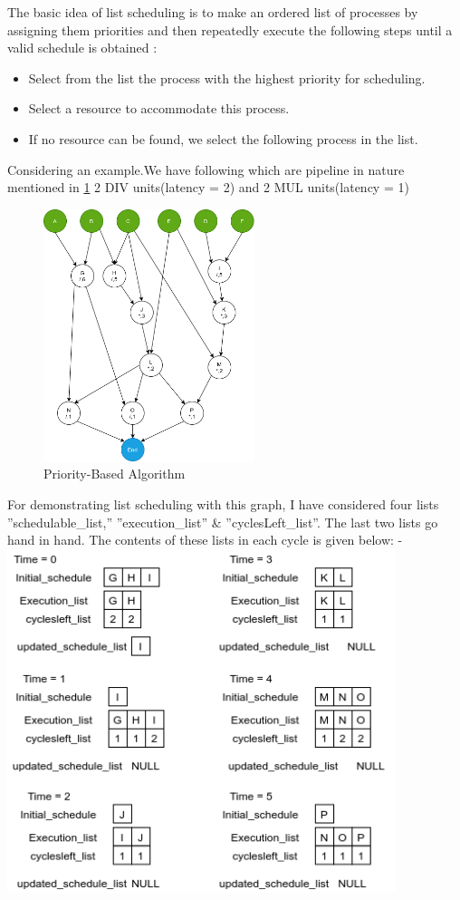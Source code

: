 The basic idea of list scheduling is to make an ordered list of processes by assigning them  priorities and then repeatedly execute the following steps until a valid schedule is obtained :
\begin{itemize}
        \item Select from the list the process with the highest priority for scheduling.
        \item Select a resource to accommodate this process.
        \item If no resource can be found, we select the following process in the list.
\end{itemize}
Considering an example.We have following which are pipeline in nature mentioned in \ref{fig:Example_graph} 2 DIV units(latency = 2) and 2 MUL units(latency = 1)
\begin{figure}[H]
    \centering
    \includegraphics[width = 0.55\textwidth]{./Scheduler/PpT-Scheduler_Example_graph.png}
    \caption{Priority-Based Algorithm}
    \label{fig:Example_graph}
\end{figure}
For demonstrating list scheduling with this graph, I have considered four lists ''schedulable\_list,”
''execution\_list” \& ''cyclesLeft\_list”. The last two lists go hand in hand. The contents of these lists
in each cycle is given below: -\\
\includegraphics[width=0.85\textwidth]{./Scheduler/PpT-Scheduler_Example_graph_ALL.png}
